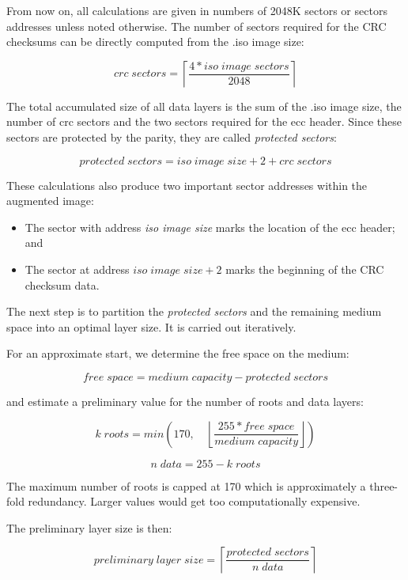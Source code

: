 \smallskip

From now on, all calculations are given in numbers of 2048K 
sectors or sectors addresses
unless noted otherwise. The number of sectors required for the
CRC checksums can be directly computed from the .iso image size:

\[
crc\; sectors = \left\lceil\frac{4 * iso\; image\; sectors}{2048}\right\rceil
\]

The total accumulated size of all data layers is the sum of the
.iso image size, the number of crc sectors and the two sectors required
for the ecc header. Since these sectors are protected by the parity,
they are called {\em protected sectors}:

\[protected\; sectors = iso\; image\; size + 2 + crc\; sectors\]
 
These calculations also produce two important sector addresses within
the augmented image:

\begin{itemize}
\item The sector with address {\em iso image size} marks the location
of the ecc header; and
\item The sector at address $iso\; image\; size + 2$ marks the beginning
of the CRC checksum data.
\end{itemize}

The next step is to partition the {\em protected sectors} and the remaining
medium space into an optimal layer size. It is carried out iteratively.

\smallskip

For an approximate start, we determine the free space on the medium:

\[free\; space = medium\; capacity - protected\; sectors\]

and estimate a preliminary value for the number of roots and data layers:

\[k\; roots = min\left(170, \quad\left\lfloor\frac{255 * free\; space}{medium\; capacity}\right\rfloor\right)\]

\[n\; data = 255 - k\; roots\]

The maximum number of roots is capped at 170 which is approximately a three-fold
redundancy. Larger values would get too computationally expensive.

\smallskip

The preliminary layer size is then:

\[preliminary\; layer\; size = \left\lceil\frac{protected\; sectors}{n\; data}\right\rceil\]

